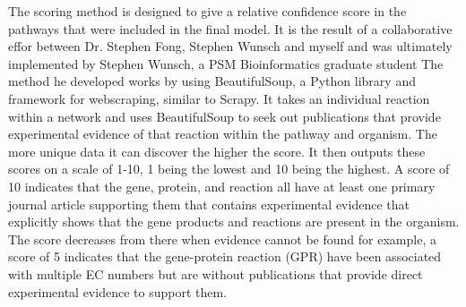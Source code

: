 \indent The scoring method is designed to give a relative confidence score in the pathways that were included in the final model. It is the result of a collaborative effor between Dr. Stephen Fong, Stephen Wunsch and myself and was ultimately implemented by Stephen Wunsch, a PSM Bioinformatics graduate student\citep{wunsch_stephen_a._scoring_2016}
The method he developed works by using BeautifulSoup, a Python library and framework for webscraping, similar to Scrapy. It takes an individual reaction within a network and uses BeautifulSoup to seek out publications that provide experimental evidence of that reaction within the pathway and organism.  The more unique data it can discover the higher the score.  It then outputs these scores on a scale of 1-10, 1 being the lowest and 10 being the highest. A score of 10 indicates that the gene, protein, and reaction all have at least one primary journal article supporting them that contains experimental evidence that explicitly shows that the gene products and reactions are present in the organism. The score decreases from there when evidence cannot be found for example, a score of 5 indicates that the gene-protein reaction (GPR) have been associated with multiple EC numbers but are without publications that provide direct experimental evidence to support them.\\